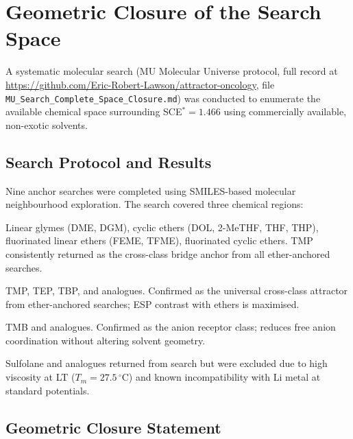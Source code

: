 \documentclass[11pt]{article}
\theoremstyle{plain}
\theoremstyle{definition}
\theoremstyle{remark}
\begin{document}
\section{Geometric Closure of the Search Space}

A systematic molecular search (MU Molecular Universe protocol, full record
at \url{https://github.com/Eric-Robert-Lawson/attractor-oncology},
file \texttt{MU\_Search\_Complete\_Space\_Closure.md}) was conducted to enumerate
the available chemical space surrounding SCE$^{*} = 1.466$ using commercially
available, non-exotic solvents.

\subsection{Search Protocol and Results}

Nine anchor searches were completed using SMILES-based molecular neighbourhood
exploration.  The search covered three chemical regions:

\begin{description}[leftmargin=2em]
  \item[Region 1 --- Ether class:] Linear glymes (DME, DGM), cyclic ethers
        (DOL, 2-MeTHF, THF, THP), fluorinated linear ethers (FEME, TFME),
        fluorinated cyclic ethers.  TMP consistently returned as the
        cross-class bridge anchor from all ether-anchored searches.
  \item[Region 2 --- Phosphate ester class:] TMP, TEP, TBP, and analogues.
        Confirmed as the universal cross-class attractor from ether-anchored
        searches; ESP contrast with ethers is maximised.
  \item[Region 3 --- Boron ester class:] TMB and analogues.  Confirmed as
        the anion receptor class; reduces free anion coordination without
        altering solvent geometry.
  \item[Region 4 --- Discards:] Sulfolane and analogues returned from search
        but were excluded due to high viscosity at LT ($T_m = 27.5\,^{\circ}$C)
        and known incompatibility with Li metal at standard potentials.
\end{description}

\subsection{Geometric Closure Statement}
\end{document}
